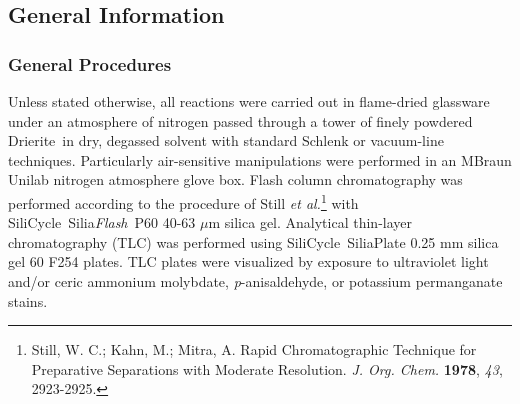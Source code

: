 
\subsection{General Information}

\subsubsection{General Procedures}
Unless stated otherwise, all reactions were carried out in flame-dried glassware under an atmosphere
of nitrogen passed through a tower of finely powdered Drierite\regtm\  in dry, degassed solvent with
standard Schlenk or vacuum-line techniques. Particularly air-sensitive manipulations were performed
in an MBraun Unilab nitrogen atmosphere glove box. Flash column chromatography was performed
according to the procedure of Still  \textit{et al.}\footnote{{\frenchspacing Still, W. C.; Kahn,
M.; Mitra, A. Rapid Chromatographic Technique for Preparative Separations with Moderate Resolution. \textit{J.
Org. Chem.} \textbf{1978}, \textit{43}, 2923-2925.}} with SiliCycle\regtm\
Silia\textit{Flash}\regtm\ P60 40-63 $\mu$m silica gel.
Analytical thin-layer chromatography (TLC) was performed using SiliCycle\regtm\  SiliaPlate 0.25 mm
silica gel 60 F254 plates. TLC plates were visualized by exposure to ultraviolet light and/or ceric ammonium
molybdate, \textit{p}-anisaldehyde, or potassium permanganate stains.

